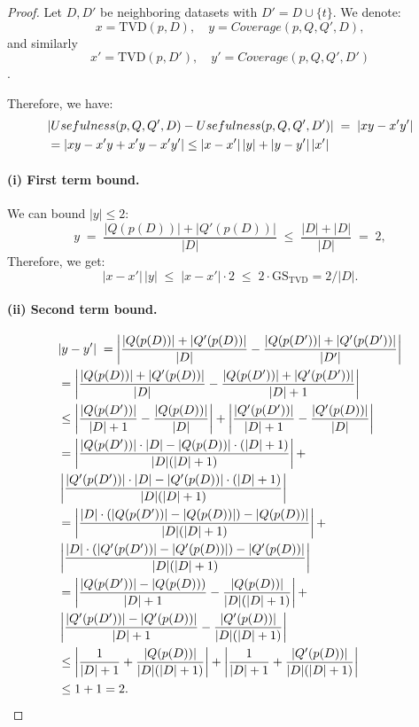 \begin{proof}
Let $D, D'$ be neighboring datasets with $D' = D \cup \{t\}$.
We denote:
\[
x = \mathrm{TVD}(p,D), \quad
y = Coverage(p,Q,Q',D),
\]
and similarly 
\[
x' = \mathrm{TVD}(p,D'), \quad
y' = Coverage(p,Q,Q',D')
\].

Therefore, we have:
\begin{align}
&|Usefulness(p,Q,Q',D) - Usefulness(p,Q,Q',D')| \;=\; |x y - x' y'| 
\notag \\
&= |xy - x'y + x'y - x'y'|
   \leq |x - x'|\,|y|
   + |y - y'|\,|x'| \label{eq:useful-diff-ineq}
\end{align}

\paragraph{(i) First term bound.}
We can bound \(|y| \leq 2\):
\[
y \;=\; \frac{|Q(p(D))| + |Q'(p(D))|}{|D|} \; \leq \; \frac{|D| + |D|}{|D|} \;=\; 2,
\]
Therefore, we get:
\begin{equation}
|x - x'|\,|y|\;\leq\; |x - x'| \cdot 2
\;\leq\; 2 \cdot \mathrm{GS}_{\mathrm{TVD}} = 2/|D|.
\label{eq:term1-bound}
\end{equation}

\paragraph{(ii) Second term bound.}
\begin{align}
&|y - y'| \;=
\left| \frac{|Q(p(D))| + |Q'(p(D))|}{|D|}
     - \frac{|Q(p(D'))| + |Q'(p(D'))|}{|D'|} \right| \notag \\
&= \left| \frac{|Q(p(D))| + |Q'(p(D))|}{|D|}
     - \frac{|Q(p(D'))| + |Q'(p(D'))|}{|D|+1} \right| \notag \\
&\leq \left| \frac{|Q(p(D'))|}{|D|+1} - \frac{|Q(p(D))|}{|D|} \right| + \left| \frac{|Q'(p(D'))|}{|D|+1} - \frac{|Q'(p(D))|}{|D|} \right| \notag \\
&= \left| \frac{|Q(p(D'))|\cdot |D|- |Q(p(D))| \cdot (|D|+1)}{|D|(|D|+1)} \right| + \notag\\
&\left| \frac{|Q'(p(D'))|\cdot |D| - |Q'(p(D))|\cdot (|D|+1)}{|D|(|D|+1)} \right| \notag \\
&= \left| \frac{|D|\cdot (|Q(p(D'))|- |Q(p(D))|) -|Q(p(D))|}{|D|(|D|+1)} \right| + \notag\\
&\left| \frac{|D|\cdot (|Q'(p(D'))| - |Q'(p(D))|) - |Q'(p(D))|}{|D|(|D|+1)} \right| \notag \\
&= \left| \frac{|Q(p(D'))|- |Q(p(D)))}{|D| + 1} - \frac{|Q(p(D))|}{|D|(|D|+1)} \right| + \notag\\
&\left| \frac{|Q'(p(D'))| - |Q'(p(D))|}{|D| + 1} - \frac{|Q'(p(D))|}{|D|(|D|+1)} \right| \notag \\
&\leq \left| \frac{1}{|D| + 1} + \frac{|Q(p(D))|}{|D|(|D|+1)} \right| + \left| \frac{1}{|D| + 1} + \frac{|Q'(p(D))|}{|D|(|D|+1)} \right| \notag \\
&\leq 1+1 =2.
\end{align}



\end{proof}
